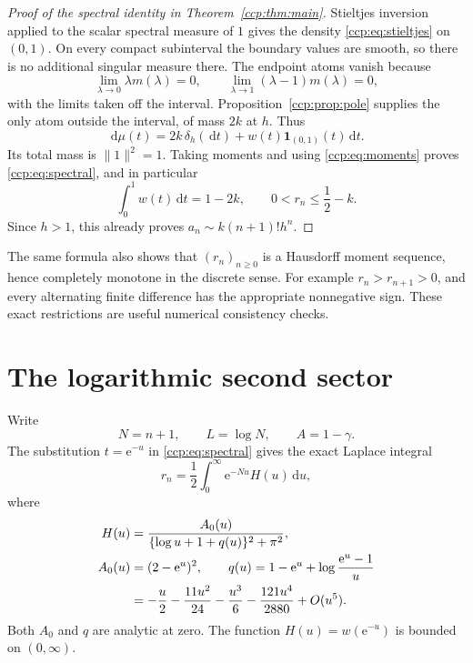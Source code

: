 \documentclass[11pt,letterpaper]{article}
\theoremstyle{remark}\newtheorem{remark}[theorem]{Remark}
\newcommand{\dd}{\,\mathrm d}
\newcommand{\ee}{\mathrm e}
\newcommand{\norm}[1]{\lVert #1\rVert}
\begin{document}
\begin{proof}[Proof of the spectral identity in Theorem~\ref{ccp:thm:main}]
Stieltjes inversion applied to the scalar spectral measure of $1$ gives the density \eqref{ccp:eq:stieltjes} on $(0,1)$. On every compact subinterval the boundary values are smooth, so there is no additional singular measure there. The endpoint atoms vanish because
\[
\lim_{\lambda\to0}\lambda m(\lambda)=0,\qquad
\lim_{\lambda\to1}(\lambda-1)m(\lambda)=0,
\]
with the limits taken off the interval. Proposition~\ref{ccp:prop:pole} supplies the only atom outside the interval, of mass $2k$ at $h$. Thus
\begin{equation}
\dd\mu(t)=2k\,\delta_h(\dd t)+w(t)\mathbf1_{(0,1)}(t)\dd t.\label{ccp:eq:measure}
\end{equation}
Its total mass is $\norm1^2=1$. Taking moments and using \eqref{ccp:eq:moments} proves \eqref{ccp:eq:spectral}, and in particular
\begin{equation}
\int_0^1w(t)\dd t=1-2k,\qquad
0<r_n\le\frac12-k.\label{ccp:eq:mass}
\end{equation}
Since $h>1$, this already proves $a_n\sim k(n+1)!h^n$.
\end{proof}

The same formula also shows that $(r_n)_{n\ge0}$ is a Hausdorff moment sequence, hence completely monotone in the discrete sense. For example $r_n>r_{n+1}>0$, and every alternating finite difference has the appropriate nonnegative sign. These exact restrictions are useful numerical consistency checks.

\section{The logarithmic second sector}
Write
\begin{equation}
N=n+1,\qquad L=\log N,\qquad A=1-\gamma.\label{ccp:eq:NL}
\end{equation}
The substitution $t=\ee^{-u}$ in \eqref{ccp:eq:spectral} gives the exact Laplace integral
\begin{equation}
r_n=\frac12\int_0^\infty\ee^{-Nu}H(u)\dd u,\label{ccp:eq:laplace}
\end{equation}
where
\begin{align}
H(u)&=\frac{A_0(u)}{\{\log u+1+q(u)\}^2+\pi^2},\label{ccp:eq:H}\\
A_0(u)&=(2-\ee^u)^2,\qquad
q(u)=1-\ee^u+\log\frac{\ee^u-1}{u}\notag\\
&=-\frac u2-\frac{11u^2}{24}-\frac{u^3}6-\frac{121u^4}{2880}+O(u^5).\label{ccp:eq:q}
\end{align}
Both $A_0$ and $q$ are analytic at zero. The function $H(u)=w(\ee^{-u})$ is bounded on $(0,\infty)$.
\end{document}
